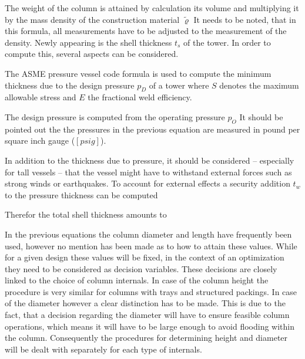     The weight of the column is attained by calculation its volume and multiplying it by the
    mass density of the construction material $\tilde{\varrho}$
    It needs to be noted, that in this formula, all measurements have to be adjusted to the measurement
    of the density. Newly appearing is the shell thickness $t_s$ of the tower. In order to compute
    this, several aspects can be considered.

    The ASME pressure vessel code formula is used to compute the minimum thickness due to the design
    pressure $p_D$ of a tower
    where $S$ denotes the maximum allowable stress and $E$ the fractional weld efficiency.

    The design pressure is computed from the operating pressure $p_O$
    It should be pointed out the the pressures in the previous equation are measured in pound per square inch
    gauge ($[psig]$).

    In addition to the thickness due to pressure, it should be considered -- especially for tall vessels --
    that the vessel might have to withstand external forces such as strong winds or earthquakes.
    To account for external effects a security addition  $t_w$ to the pressure thickness can be computed

    Therefor the total shell thickness amounts to

    In the previous equations the column diameter and length have frequently been used, however no mention
    has been made as to how to attain these values. While for a given design these values will be fixed,
    in the context of an optimization they need to be considered as decision variables. These decisions
    are closely linked to the choice of column internals. In case of the column height the procedure
    is very similar for columns with trays and structured packings. In case of the diameter however
    a clear distinction has to be made. This is due to the fact, that a decision regarding the diameter
    will have to ensure feasible column operations, which means it will have to be large enough to
    avoid flooding within the column. Consequently the procedures for determining height and diameter
    will be dealt with separately for each type of internals.

